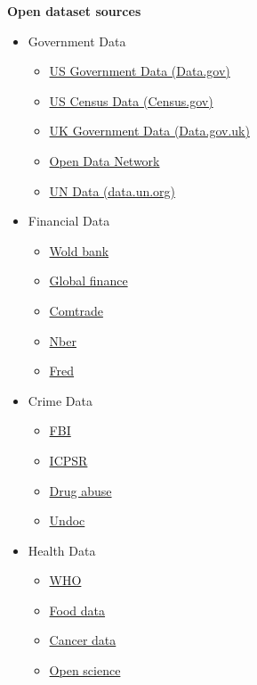 \documentclass[12pt]{report} %
\begin{document}
	\noindent\textbf{Open dataset sources}
	
	\begin{itemize}
		\item Government Data
		\begin{itemize}
			\item \href{https://www.data.gov/}{US Government Data (Data.gov)}
			\item \href{https://www.census.gov/data.html}{US Census Data (Census.gov)}
			\item \href{https://data.gov.uk/}{UK Government Data (Data.gov.uk)}
			\item \href{https://www.opendatanetwork.com/}{Open Data Network}
			\item \href{https://data.un.org/}{UN Data (data.un.org)}
		\end{itemize}
		\item Financial Data
		\begin{itemize}
			\item \href{https://data.worldbank.org/}{Wold bank}
			\item \href{https://www.globalfinancialdata.com/}{Global finance}
			\item \href{https://comtrade.un.org/}{Comtrade}
			\item \href{https://www.nber.org/}{Nber}
			\item \href{https://fred.stlouisfed.org/}{Fred}
		\end{itemize}
		\item Crime Data
		\begin{itemize}
			\item \href{https://www.fbi.gov/services/cjis/ucr}{FBI}
			\item \href{https://www.icpsr.umich.edu/icpsrweb/content/NACJD/index.html}{ICPSR}
			\item \href{https://www.drugabuse.gov/related-topics/trends-statistics}{Drug abuse}
			\item \href{https://www.unodc.org/unodc/en/data-and-analysis/}{Undoc}
		\end{itemize}
		\item Health Data
		\begin{itemize}
			\item \href{https://www.who.int/gho/database/en/}{WHO}
			\item \href{https://www.fda.gov/Food/default.htm}{Food data}
			\item \href{https://seer.cancer.gov/faststats/selections.php?series=cancer}{Cancer data}
			\item \href{https://www.opensciencedatacloud.org/}{Open science}

\end{itemize}
\end{itemize}
\end{document}
